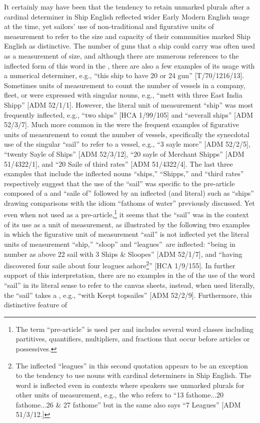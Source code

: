 It certainly may have been that the tendency to retain unmarked plurals after a cardinal determiner in Ship English reflected wider Early Modern English usage at the time, yet sailors’ use of non-traditional and figurative units of measurement to refer to the size and capacity of their communities marked Ship English as distinctive. The number of guns that a ship could carry was often used as a measurement of size, and although there are numerous references to the inflected form of this word in the , there are also a few examples of its  usage with a numerical determiner, e.g., “this ship to have 20 or 24 gun” [T/70/1216/13]. Sometimes units of measurement to count the number of vessels in a company, fleet, or  were expressed with singular nouns, e.g., “mett with three East India Shipp” [ADM 52/1/1]. However, the literal unit of measurement “ship” was most frequently inflected, e.g., “two ships” [HCA 1/99/105] and “severall ships” [ADM 52/3/7]. Much more common in the  were the frequent examples of  figurative units of measurement to count the number of vessels, specifically the synecdotal use of the singular  “sail” to refer to a vessel, e.g., “3 sayle more” [ADM 52/2/5], “twenty Sayle of Ships” [ADM 52/3/12], “20 sayle of Merchant Shipps” [ADM 51/4322/1], and “20 Saile of third rates” [ADM 51/4322/4]. The last three examples that include the inflected nouns “ships,” “Shipps,” and “third rates” respectively suggest that the use of the  “sail” was specific to the pre-article composed of a  and “saile of” followed by an inflected (and literal)  such as “ships” drawing comparisons with the idiom “fathoms of water” previously discussed. Yet even when not used as a pre-article,\footnote{The term “pre-article” is used per \citet[76]{Morenberg2010} and includes several word classes including partitives, quantifiers, multipliers, and fractions that occur before articles or possessives.} it seems that the  “sail” was  in the context of its use as a unit of measurement, as illustrated by the following two examples in which the figurative unit of measurement “sail” is not inflected yet the literal units of measurement “ship,” “sloop” and “leagues”~are inflected: “being in number as above 22 sail with 3  Ships \& Sloopes” [ADM 52/1/7], and “having discovered four saile about four leagues ashore\footnote{The inflected  “leagues” in this second quotation appears to be an exception to the tendency to use  nouns with cardinal determiners in Ship English. The word is inflected even in contexts where speakers use unmarked plurals for other units of measurement, e.g., the  who refers to “13 fathome...20 fathome...26 \& 27 fathome” but in the same  also says “7 Leagues” [ADM 51/3/12.]}” [HCA 1/9/155]. In further support of this interpretation, there are no examples in the  of the  use of the word “sail” in its literal sense to refer to the  canvas sheets, instead, when used literally, the  “sail” takes a , e.g., “with Keept topsailes” [ADM 52/2/9]. Furthermore, this distinctive feature of 